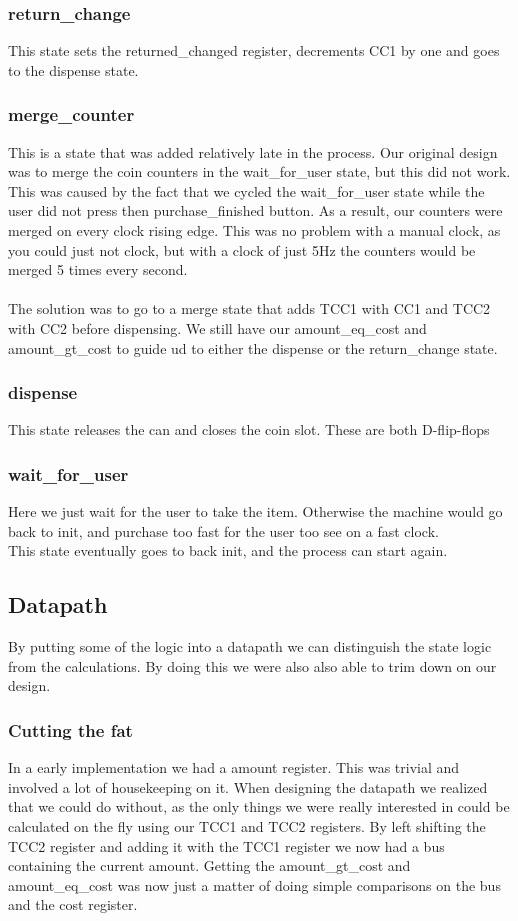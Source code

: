 \subsubsection{return\_change}
This state sets the returned\_changed register, decrements CC1 by one and goes to the dispense state.

\subsubsection{merge\_counter}
This is a state that was added relatively late in the process. Our original design was to merge the coin counters in the wait\_for\_user state, but this did not work. This was caused by the fact that we cycled the wait\_for\_user state while the user did not press then purchase\_finished button. As a result, our counters were merged on every clock rising edge. This was no problem with a manual clock, as you could just not clock, but with a clock of just 5Hz the counters would be merged 5 times every second.\\
\\
The solution was to go to a merge state that adds TCC1 with CC1 and TCC2 with CC2 before dispensing. We still have our amount\_eq\_cost and amount\_gt\_cost to guide ud to either the dispense or  the return\_change state.

\subsubsection{dispense}
This state releases the can and closes the coin slot. These are both D-flip-flops

\subsubsection{wait\_for\_user}
Here we just wait for the user to take the item. Otherwise the machine would go back to init, and purchase too fast for the user too see on a fast clock.\\
This state eventually goes to back init, and the process can start again.

\subsection{Datapath}

By putting some of the logic into a datapath we can distinguish the state logic from the calculations. By doing this we were also also able to trim down on our design.
\subsubsection{Cutting the fat}
In a early implementation we had a amount register. This was trivial and involved a lot of housekeeping on it. When designing the datapath we realized that we could do without, as the only things we were really interested in could be calculated on the fly using our TCC1 and TCC2 registers. By left shifting the TCC2 register and adding it with the TCC1 register we now had a bus containing the current amount. Getting the amount\_gt\_cost and amount\_eq\_cost was now just a matter of doing simple comparisons on the bus and the cost register.
